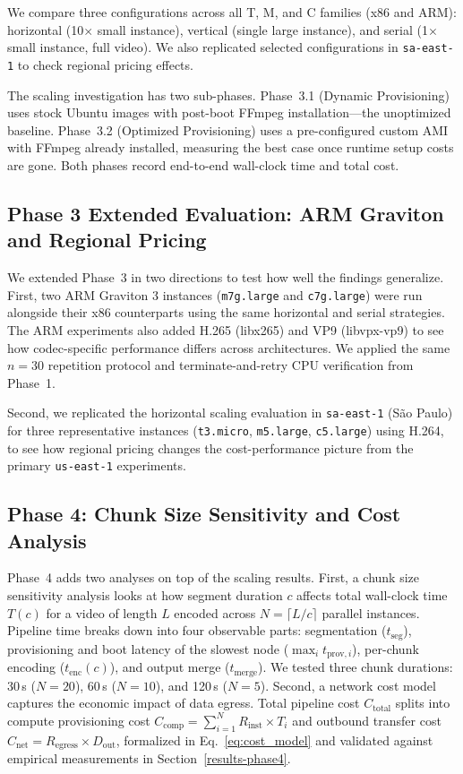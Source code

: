 \documentclass[conference]{IEEEtran}
\begin{document}
We compare three configurations across all T, M, and C families (x86 and ARM): horizontal (10$\times$ small instance), vertical (single large instance), and serial (1$\times$ small instance, full video). We also replicated selected configurations in \texttt{sa-east-1} to check regional pricing effects.

The scaling investigation has two sub-phases. Phase~3.1 (Dynamic Provisioning) uses stock Ubuntu images with post-boot FFmpeg installation---the unoptimized baseline. Phase~3.2 (Optimized Provisioning) uses a pre-configured custom AMI with FFmpeg already installed, measuring the best case once runtime setup costs are gone. Both phases record end-to-end wall-clock time and total cost.

\subsection{Phase 3 Extended Evaluation: ARM Graviton and Regional Pricing}

We extended Phase~3 in two directions to test how well the findings generalize. First, two ARM Graviton 3 instances (\texttt{m7g.large} and \texttt{c7g.large}) were run alongside their x86 counterparts using the same horizontal and serial strategies. The ARM experiments also added H.265 (libx265) and VP9 (libvpx-vp9) to see how codec-specific performance differs across architectures. We applied the same $n=30$ repetition protocol and terminate-and-retry CPU verification from Phase~1.

Second, we replicated the horizontal scaling evaluation in \texttt{sa-east-1} (S\~{a}o Paulo) for three representative instances (\texttt{t3.micro}, \texttt{m5.large}, \texttt{c5.large}) using H.264, to see how regional pricing changes the cost-performance picture from the primary \texttt{us-east-1} experiments.

\subsection{Phase 4: Chunk Size Sensitivity and Cost Analysis}

Phase~4 adds two analyses on top of the scaling results. First, a chunk size sensitivity analysis looks at how segment duration $c$ affects total wall-clock time $T(c)$ for a video of length $L$ encoded across $N = \lceil L/c \rceil$ parallel instances. Pipeline time breaks down into four observable parts: segmentation ($t_{\text{seg}}$), provisioning and boot latency of the slowest node ($\max_i t_{\text{prov},i}$), per-chunk encoding ($t_{\text{enc}}(c)$), and output merge ($t_{\text{merge}}$). We tested three chunk durations: 30\,s ($N=20$), 60\,s ($N=10$), and 120\,s ($N=5$). Second, a network cost model captures the economic impact of data egress. Total pipeline cost $C_{\text{total}}$ splits into compute provisioning cost $C_{\text{comp}} = \sum_{i=1}^{N} R_{\text{inst}} \times T_i$ and outbound transfer cost $C_{\text{net}} = R_{\text{egress}} \times D_{\text{out}}$, formalized in Eq.~\ref{eq:cost_model} and validated against empirical measurements in Section~\ref{results-phase4}.
\end{document}
